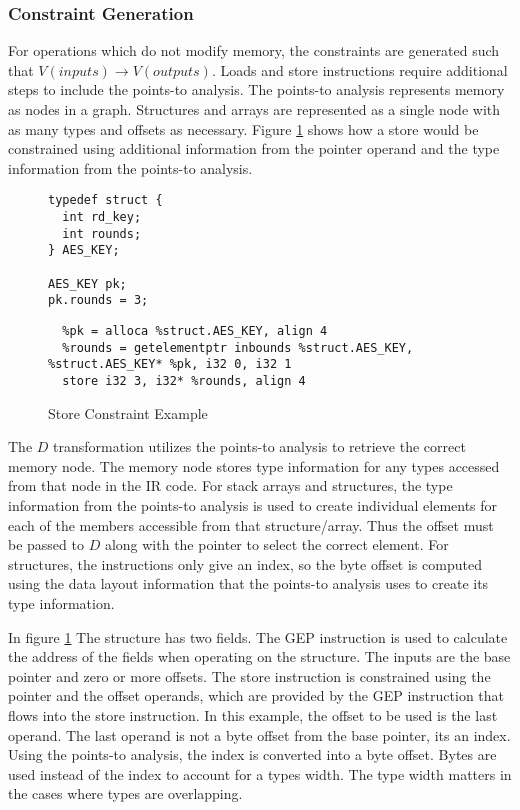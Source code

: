 \subsubsection{Constraint Generation}

For operations which do not modify memory, the constraints are generated such
that $V(inputs) \rightarrow V(outputs)$. Loads and store instructions require
additional steps to include the points-to analysis. The points-to analysis
represents memory as nodes in a graph. Structures and arrays are represented as
a single node with as many types and offsets as necessary. Figure
\ref{fig:storeconstraint} shows how a store would be constrained using
additional information from the pointer operand and the type information from
the points-to analysis.


\begin{figure}[h!]
\begin{lstlisting}
typedef struct {
  int rd_key;
  int rounds;
} AES_KEY;

AES_KEY pk;
pk.rounds = 3;
\end{lstlisting}

\begin{lstlisting}
  %pk = alloca %struct.AES_KEY, align 4
  %rounds = getelementptr inbounds %struct.AES_KEY, %struct.AES_KEY* %pk, i32 0, i32 1
  store i32 3, i32* %rounds, align 4
\end{lstlisting}
  \caption{Store Constraint Example}
  \label{fig:storeconstraint}
\end{figure}

The $D$ transformation utilizes the points-to analysis to retrieve the correct
memory node. The memory node stores type information for any types accessed from
that node in the IR code. For stack arrays and structures, the type information
from the points-to analysis is used to create individual elements for each of
the members accessible from that structure/array. Thus the offset must be passed
to $D$ along with the pointer to select the correct element. For structures, the
instructions only give an index, so the byte offset is computed using the data
layout information that the points-to analysis uses to create its type information.

In figure \ref{fig:storeconstraint} The  structure has two
fields. The GEP instruction is used to calculate the address of the fields when
operating on the structure. The inputs are the base pointer and zero or more
offsets. The store instruction is constrained using the pointer and the offset
operands, which are provided by the GEP instruction that flows into the store
instruction. In this example, the offset to be used is the last operand. The
last operand is not a byte offset from the base pointer, its an index. Using the
points-to analysis, the index is converted into a byte offset. Bytes are used
instead of the index to account for a types width. The type width matters in the
cases where types are overlapping.

